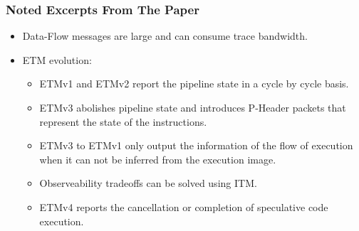 \documentclass{beamer}
\begin{document}
\begin{frame}
    \frametitle{Noted Excerpts From The Paper}
    \begin{itemize}
        \item Data-Flow messages are large and can consume trace bandwidth.
        \item ETM evolution:
            \begin{itemize}
                \item ETMv1 and ETMv2 report the pipeline state in a cycle by
                    cycle basis.
                \item ETMv3 abolishes pipeline state and introduces P-Header
                    packets that represent the state of the instructions.
                \item ETMv3 to ETMv1 only output the information of the flow of
                    execution when it can not be inferred from the execution
                    image.
                \item Observeability tradeoffs can be solved using ITM.
                \item ETMv4 reports the cancellation or completion of
                    speculative code execution.
            \end{itemize}
    \end{itemize}
\end{frame}
\end{document}

